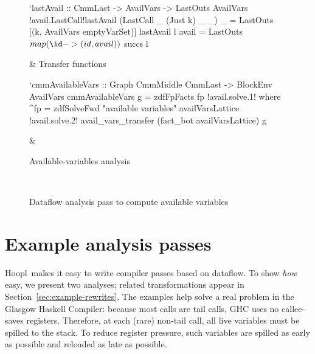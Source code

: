 \documentclass[blockstyle,preprint,natbib,nocopyrightspace]{sigplanconf}
\newcommand\ourlib{Hoopl}  %
\def\baselinestretch{0.8}\tiny
\def\baselinestretch{0.8}\tiny
\newcommand\secref[1]{Section~\ref{sec:#1}}
\newcommand\seclabel[1]{\label{sec:#1}}
\newcommand\figlabel[1]{\label{fig:#1}}
\begin{document}
\begin{figure*}
\begin{codetable}
\begin{code}
`lastAvail :: CmmLast -> AvailVars -> LastOuts AvailVars
!avail.LastCall!lastAvail (LastCall _ (Just k) _ _) _ = LastOuts [(k, AvailVars emptyVarSet)]
lastAvail l avail = LastOuts $ map (\id -> (id, avail)) $ succs l
\end{code}
\B
& \mbox{\phantom{SPACE}}
\mbox{\phantom{XXXX}Transfer} \mbox{\phantom{XXXX}functions}\\
\hline

\T
\begin{code}
`cmmAvailableVars :: Graph CmmMiddle CmmLast -> BlockEnv AvailVars
cmmAvailableVars g = zdfFpFacts fp
!avail.solve.1!  where ^fp = zdfSolveFwd "available variables" availVarsLattice 
!avail.solve.2!                 avail_vars_transfer (fact_bot availVarsLattice) g
\end{code}
\B
& %
\def\baselinestretch{0.8}\hspace{-0.3in}\parbox{1.6in}{\center Available-variables analysis}
\\

\end{codetable}
\caption{Dataflow analysis pass to compute available variables}
\figlabel{avail-all}
\figlabel{avail}
\figlabel{avail-lattice}
\figlabel{avail-gen-kill}
\figlabel{avail-transfers}
\figlabel{avail-running}
\end{figure*}

\section{Example analysis passes}

\seclabel{example-analyses}


\ourlib\
makes it easy to write compiler passes based on dataflow.
To show \emph{how} easy, we present
two analyses;
related transformations appear in \secref{example-rewrites}. 
The examples help solve a real problem in the Glasgow Haskell
Compiler:
because most calls are tail calls, GHC uses no 
callee-saves registers.
Therefore, at each (rare) non-tail call, all live
variables must be spilled to the stack.
\ifcutting\else
To reduce register pressure,
such variables are spilled as early as possible and reloaded as late as
possible. 
\fi
\end{document}
